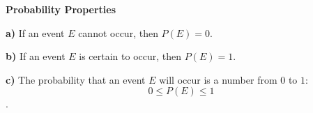 {\bf Probability Properties}
\vskip 6pt

{\bf a)} If an event $E$ cannot occur, then $P(E)=0$.
\vskip 1mm

{\bf b)} If an event $E$ is certain to occur, then $P(E)=1$.
\vskip 1mm

{\bf c)} The probability that an event $E$ will occur is a number from $0$ to $1:$ $$0\leq P(E) \leq 1$$.

\vfill\eject
